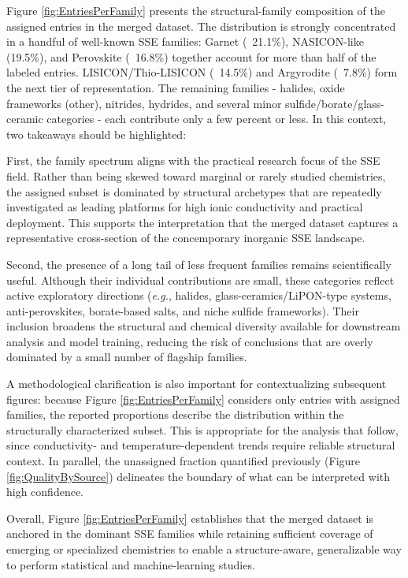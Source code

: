 \documentclass[a4paper,fleqn]{cas-sc}
\begin{document}
Figure \ref{fig:EntriesPerFamily} presents the structural-family composition of the assigned entries in the merged dataset. The distribution is strongly concentrated in a handful of well-known SSE families: Garnet (~21.1\%), NASICON-like (19.5\%), and Perovskite (~16.8\%) together account for more than half of the labeled entries. LISICON/Thio-LISICON (~14.5\%) and Argyrodite (~7.8\%) form the next tier of representation. The remaining families - halides, oxide frameworks (other), nitrides, hydrides, and several minor sulfide/borate/glass-ceramic categories - each contribute only a few percent or less. In this context, two takeaways should be highlighted:

First, the family spectrum aligns with the practical research focus of the SSE field. Rather than being skewed toward marginal or rarely studied chemistries, the assigned subset is dominated by structural archetypes that are repeatedly investigated as leading platforms for high ionic conductivity and practical deployment. This supports the interpretation that the merged dataset captures a representative cross-section of the concemporary inorganic SSE landscape.

Second, the presence of a long tail of less frequent families remains scientifically useful. Although their individual contributions are small, these categories reflect active exploratory directions (\textit{e.g.}, halides, glass-ceramics/LiPON-type systems, anti-perovskites, borate-based salts, and niche sulfide frameworks). Their inclusion broadens the structural and chemical diversity available for downstream analysis and model training, reducing the risk of conclusions that are overly dominated by a small number of flagship families.

A methodological clarification is also important for contextualizing subsequent figures: because Figure \ref{fig:EntriesPerFamily} considers only entries with assigned families, the reported proportions describe the distribution within the structurally characterized subset. This is appropriate for the analysis that follow, since conductivity- and temperature-dependent trends require reliable structural context. In parallel, the unassigned fraction quantified previously (Figure \ref{fig:QualityBySource}) delineates the boundary of what can be interpreted with high confidence.

Overall, Figure \ref{fig:EntriesPerFamily} establishes that the merged dataset is anchored in the dominant SSE families while retaining sufficient coverage of emerging or specialized chemistries to enable a structure-aware, generalizable way to perform statistical and machine-learning studies. 
\end{document}
